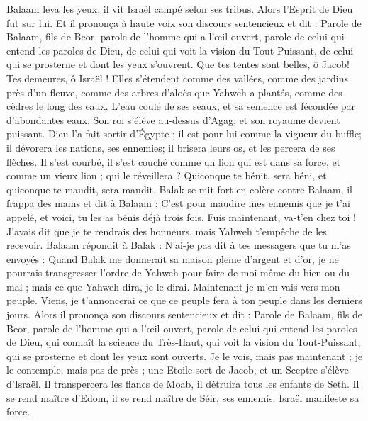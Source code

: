 \begin{multicols}{2}
Balaam leva les yeux, il vit Israël campé selon ses tribus. Alors l'Esprit de Dieu fut sur lui.
Et il prononça à haute voix son discours sentencieux et dit : Parole de Balaam, fils de Beor, parole de l'homme qui a l'œil ouvert,
parole de celui qui entend les paroles de Dieu, de celui qui voit la vision du Tout-Puissant, de celui qui se prosterne et dont les yeux s'ouvrent.
Que tes tentes sont belles, ô Jacob! Tes demeures, ô Israël !
Elles s'étendent comme des vallées, comme des jardins près d'un fleuve, comme des arbres d'aloès que Yahweh a plantés, comme des cèdres le long des eaux.
L'eau coule de ses seaux, et sa semence est fécondée par d'abondantes eaux. Son roi s'élève au-dessus d'Agag, et son royaume devient puissant.
Dieu l'a fait sortir d'Égypte ; il est pour lui comme la vigueur du buffle; il dévorera les nations, ses ennemies; il brisera leurs os, et les percera de ses flèches.
Il s'est courbé, il s'est couché comme un lion qui est dans sa force, et comme un vieux lion ; qui le réveillera ? Quiconque te bénit, sera béni, et quiconque te maudit, sera maudit.
Balak se mit fort en colère contre Balaam, il frappa des mains et dit à Balaam : C'est pour maudire mes ennemis que je t'ai appelé, et voici, tu les as bénis déjà trois fois.
Fuis maintenant, va-t'en chez toi ! J'avais dit que je te rendrais des honneurs, mais Yahweh t'empêche de les recevoir.
Balaam répondit à Balak : N'ai-je pas dit à tes messagers que tu m'as envoyés :
Quand Balak me donnerait sa maison pleine d'argent et d'or, je ne pourrais transgresser l'ordre de Yahweh pour faire de moi-même du bien ou du mal ; mais ce que Yahweh dira, je le dirai.
Maintenant je m'en vais vers mon peuple. Viens, je t'annoncerai ce que ce peuple fera à ton peuple dans les derniers jours.
Alors il prononça son discours sentencieux et dit : Parole de Balaam, fils de Beor, parole de l'homme qui a l'œil ouvert,
parole de celui qui entend les paroles de Dieu, qui connaît la science du Très-Haut, qui voit la vision du Tout-Puissant, qui se prosterne et dont les yeux sont ouverts.
Je le vois, mais pas maintenant ; je le contemple, mais pas de près ; une Etoile sort de Jacob, et un Sceptre s'élève d'Israël. Il transpercera les flancs de Moab, il détruira tous les enfants de Seth.
Il se rend maître d'Edom, il se rend maître de Séir, ses ennemis. Israël manifeste sa force.

\end{multicols}
